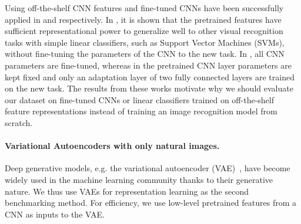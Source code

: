 Using off-the-shelf CNN features and fine-tuned CNNs have been successfully applied in \cite{donahue2014decaf,razavian2014cnnfeatures} and \cite{Girshick2014rich-feature-hierarchies, oquab2014learning-and-transferring, Zhang2014PartbasedRCNN} respectively.
In \cite{donahue2014decaf,razavian2014cnnfeatures}, it is shown that the pretrained features have sufficient representational power to generalize well to other visual recognition tasks with simple linear classifiers, such as Support Vector Machines (SVMs), without fine-tuning the parameters of the CNN to the new task. In \cite{Girshick2014rich-feature-hierarchies, Zhang2014PartbasedRCNN}, all CNN parameters are fine-tuned, whereas in \cite{oquab2014learning-and-transferring} the pretrained CNN layer parameters are kept fixed and only an adaptation layer of two fully connected layers are trained on the new task. The results from these works motivate why we should evaluate our dataset on fine-tuned CNNs or linear classifiers trained on off-the-shelf feature representations instead of training an image recognition model from scratch. 

\paragraph*{Variational Autoencoders with only natural images.}
Deep generative models, 
e.g. the variational autoencoder (VAE)~\cite{kingma2014autoencoding,Rezende2014StochasticBA,zhang2017advances}, have become widely used in the machine learning community thanks to their generative nature. We thus use VAEs for representation learning as the second benchmarking method. For efficiency, we use low-level pretrained features from a CNN as inputs to the VAE.

